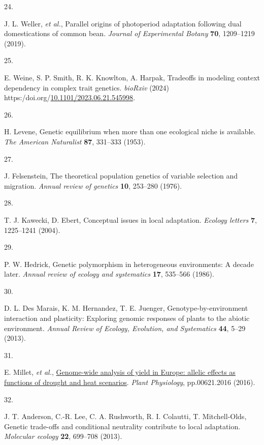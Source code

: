 \documentclass[
  9pt,
  twocolumn,
  twoside]{pnas-new}
\newlength{\cslhangindent}
\newlength{\csllabelwidth}
\newenvironment{CSLReferences}[2] %
 {\begin{list}{}{%
  \setlength{\itemindent}{0pt}
  \setlength{\leftmargin}{0pt}
  \setlength{\parsep}{0pt}
  \ifodd #1
   \setlength{\leftmargin}{\cslhangindent}
   \setlength{\itemindent}{-1\cslhangindent}
  \fi
  \setlength{\itemsep}{#2\baselineskip}}}
 {\end{list}}
\newcommand{\CSLLeftMargin}[1]{\parbox[t]{\csllabelwidth}{\strut#1\strut}}
\newcommand{\CSLRightInline}[1]{\parbox[t]{\linewidth - \csllabelwidth}{\strut#1\strut}}
\begin{document}
\begin{CSLReferences}{0}{1}
\CSLLeftMargin{24. }%
\CSLRightInline{J. L. Weller, \emph{et al.}, Parallel origins of
photoperiod adaptation following dual domestications of common bean.
\emph{Journal of Experimental Botany} \textbf{70}, 1209--1219 (2019).}

\CSLLeftMargin{25. }%
\CSLRightInline{E. Weine, S. P. Smith, R. K. Knowlton, A. Harpak,
Tradeoffs in modeling context dependency in complex trait genetics.
\emph{bioRxiv} (2024)
https:/doi.org/\href{https://doi.org/10.1101/2023.06.21.545998}{10.1101/2023.06.21.545998}.}

\CSLLeftMargin{26. }%
\CSLRightInline{H. Levene, Genetic equilibrium when more than one
ecological niche is available. \emph{The American Naturalist}
\textbf{87}, 331--333 (1953).}

\CSLLeftMargin{27. }%
\CSLRightInline{J. Felsenstein, The theoretical population genetics of
variable selection and migration. \emph{Annual review of genetics}
\textbf{10}, 253--280 (1976).}

\CSLLeftMargin{28. }%
\CSLRightInline{T. J. Kawecki, D. Ebert, Conceptual issues in local
adaptation. \emph{Ecology letters} \textbf{7}, 1225--1241 (2004).}

\CSLLeftMargin{29. }%
\CSLRightInline{P. W. Hedrick, Genetic polymorphism in heterogeneous
environments: A decade later. \emph{Annual review of ecology and
systematics} \textbf{17}, 535--566 (1986).}

\CSLLeftMargin{30. }%
\CSLRightInline{D. L. Des Marais, K. M. Hernandez, T. E. Juenger,
Genotype-by-environment interaction and plasticity: Exploring genomic
responses of plants to the abiotic environment. \emph{Annual Review of
Ecology, Evolution, and Systematics} \textbf{44}, 5--29 (2013).}

\CSLLeftMargin{31. }%
\CSLRightInline{E. Millet, \emph{et al.},
\href{https://doi.org/10.1104/pp.16.00621}{Genome-wide analysis of yield
in Europe: allelic effects as functions of drought and heat scenarios}.
\emph{Plant Physiology}, pp.00621.2016 (2016).}

\CSLLeftMargin{32. }%
\CSLRightInline{J. T. Anderson, C.-R. Lee, C. A. Rushworth, R. I.
Colautti, T. Mitchell-Olds, Genetic trade-offs and conditional
neutrality contribute to local adaptation. \emph{Molecular ecology}
\textbf{22}, 699--708 (2013).}


\end{CSLReferences}
\end{document}
